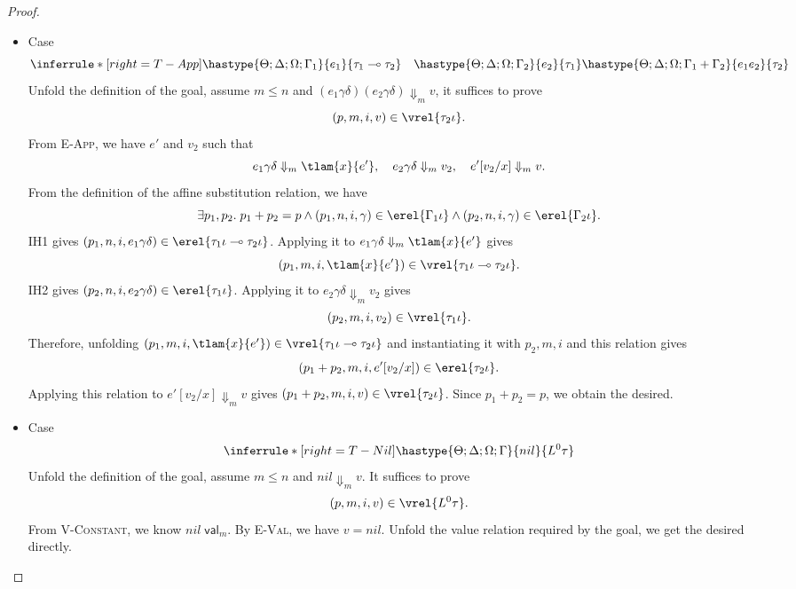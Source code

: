 \begin{proof}
\begin{itemize}
\item Case 
\[
\inferrule*[right=T-App]
    {\hastype{\Theta;\Delta;\Omega;\Gamma_1}{e_1}{\tau_1 \multimap \tau_2}
      \quad \hastype{\Theta;\Delta;\Omega;\Gamma_2}{e_2}{\tau_1}}
    {\hastype{\Theta;\Delta;\Omega;\Gamma_1+\Gamma_2}{e_1e_2}{\tau_2}}
\]
Unfold the definition of the goal, assume $m\leq n$ and
$(e_1\gamma\delta)(e_2\gamma\delta)\Downarrow_m v$, it suffices to prove
\[(p, m, i, v)\in\vrel{\tau_2\iota}.\]
From \textsc{E-App}, we have $e'$ and $v_2$ such that
\[
  e_1\gamma\delta\Downarrow_m\tlam{x}{e'},
  \quad e_2\gamma\delta\Downarrow_m v_2,
  \quad e'[v_2/x]\Downarrow_m v.
\]
From the definition of the affine substitution relation, we have
\[
  \exists p_1, p_2.\;p_1 + p_2= p \land
  (p_1,n,i,\gamma) \in \erel{\Gamma_1\iota} \land
  (p_2,n, i, \gamma) \in \erel{\Gamma_2\iota}.
\]
IH1 gives $(p_1, n, i, e_1\gamma\delta)\in\erel{\tau_1\iota \multimap \tau_2\iota}$.
Applying it to $e_1\gamma\delta\Downarrow_m\tlam{x}{e'}$ gives
\[(p_1, m, i, \tlam{x}{e'}) \in \vrel{\tau_1\iota \multimap \tau_2\iota}.\]
IH2 gives $(p_2, n, i, e_2\gamma\delta)\in\erel{\tau_1\iota}$.
Applying it to $e_2\gamma\delta\Downarrow_m v_2$ gives
\[(p_2, m, i, v_2)\in\vrel{\tau_1\iota}.\]
Therefore, unfolding $(p_1, m, i, \tlam{x}{e'}) \in \vrel{\tau_1\iota \multimap \tau_2\iota}$ and instantiating it
with $p_2, m, i$ and this relation gives
\[(p_1+p_2, m, i, e'[v_2/x])\in\erel{\tau_2\iota}.\]
Applying this relation to $e'[v_2/x]\Downarrow_m v$ gives $(p_1+p_2, m, i, v)\in\vrel{\tau_2\iota}$.
Since $p_1+p_2 = p$, we obtain the desired.

\item Case
\[
  \inferrule*[right=T-Nil]
      { }
      {\hastype{\Theta;\Delta;\Omega;\Gamma}{nil}{L^0\tau}}
\]
Unfold the definition of the goal, assume $m \leq n$ and
$nil \Downarrow_m v$.  It suffices to prove
\[(p, m, i, v) \in \vrel{L^0\tau}.\]
From \textsc{V-Constant}, we know $nil\;\mathsf{val}_m$.
By \textsc{E-Val}, we have $v=nil$.
Unfold the value relation required by the goal, we get the desired directly.


\end{itemize}
\end{proof}
